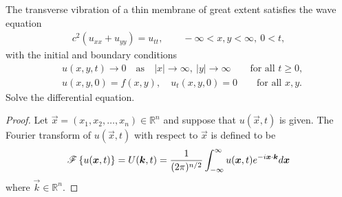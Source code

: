 \begin{problem}{2.48}
  The transverse vibration of a thin membrane of great extent satisfies the wave equation
  \begin{align*}
    c^2(u_{xx} + u_{yy}) = u_{tt}, \qquad -\infty < x, y < \infty,\ 0 < t,
  \end{align*}
  with the initial and boundary conditions
  \begin{align*}
    &u(x, y, t) \to 0 \quad \text{as} \quad |x| \to \infty,\ |y| \to \infty \qquad \text{for all $t\geq 0$},\\
    &u(x, y, 0) = f(x, y),\quad u_t(x, y, 0) = 0 \qquad \text{for all $x, y$}.
  \end{align*}
  Solve the differential equation.
\end{problem}

\begin{proof}
  Let $\vec{x} = (x_1, x_2, \dots, x_n)\in \mathbb{R}^n$ and suppose that $u(\vec{x}, t)$ is given. The
  Fourier transform of $u(\vec{x}, t)$ with respect to $\vec{x}$ is defined to be
  \begin{align}\label{multifourier}
    \mathscr{F}\left\{ {u(\boldsymbol{x}, t)} \right\} = U(\boldsymbol{k}, t) = \frac{1}{(2\pi)^{n/2}}\int_{-\infty}^\infty u(\boldsymbol{x}, t) e^{-i\boldsymbol{x}\cdot\boldsymbol{k}} d\boldsymbol{x}
  \end{align}
  where $\vec{k}\in\mathbb{R}^n$.


\end{proof}
